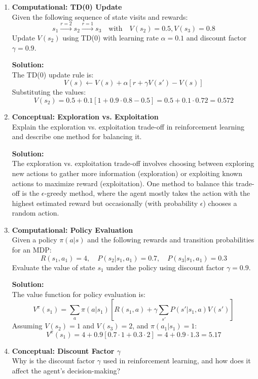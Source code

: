 \documentclass{article}
\begin{document}
\begin{enumerate}[label=Q\arabic*.]
\item \textbf{Computational: TD(0) Update} \\
Given the following sequence of state visits and rewards:
\[
s_1 \xrightarrow{r=2} s_2 \xrightarrow{r=1} s_3 \quad \text{with} \quad V(s_2) = 0.5, V(s_3) = 0.8
\]
Update $V(s_2)$ using TD(0) with learning rate $\alpha = 0.1$ and discount factor $\gamma = 0.9$.

\textbf{Solution:} \\
The TD(0) update rule is:
\[
V(s) \leftarrow V(s) + \alpha \left[ r + \gamma V(s') - V(s) \right]
\]
Substituting the values:
\[
V(s_2) = 0.5 + 0.1 \left[ 1 + 0.9 \cdot 0.8 - 0.5 \right] = 0.5 + 0.1 \cdot 0.72 = 0.572
\]

\item \textbf{Conceptual: Exploration vs. Exploitation} \\
Explain the exploration vs. exploitation trade-off in reinforcement learning and describe one method for balancing it.

\textbf{Solution:} \\
The exploration vs. exploitation trade-off involves choosing between exploring new actions to gather more information (exploration) or exploiting known actions to maximize reward (exploitation). One method to balance this trade-off is the $\epsilon$-greedy method, where the agent mostly takes the action with the highest estimated reward but occasionally (with probability $\epsilon$) chooses a random action.

\item \textbf{Computational: Policy Evaluation} \\
Given a policy $\pi(a|s)$ and the following rewards and transition probabilities for an MDP:
\[
R(s_1, a_1) = 4, \quad P(s_2|s_1, a_1) = 0.7, \quad P(s_3|s_1, a_1) = 0.3
\]
Evaluate the value of state $s_1$ under the policy using discount factor $\gamma = 0.9$.

\textbf{Solution:} \\
The value function for policy evaluation is:
\[
V^\pi(s_1) = \sum_{a} \pi(a|s_1) \left[ R(s_1, a) + \gamma \sum_{s'} P(s'|s_1, a) V(s') \right]
\]
Assuming $V(s_2) = 1$ and $V(s_3) = 2$, and $\pi(a_1|s_1) = 1$:
\[
V^\pi(s_1) = 4 + 0.9 \left[ 0.7 \cdot 1 + 0.3 \cdot 2 \right] = 4 + 0.9 \cdot 1.3 = 5.17
\]

\item \textbf{Conceptual: Discount Factor $\gamma$} \\
Why is the discount factor $\gamma$ used in reinforcement learning, and how does it affect the agent's decision-making?


\end{enumerate}
\end{document}

